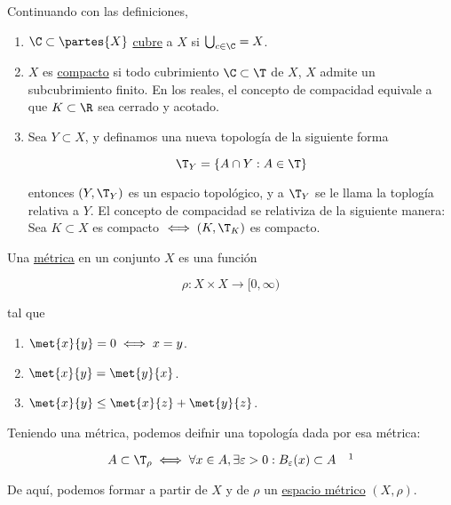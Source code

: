 \begin{defn}
    Continuando con las definiciones,
    
    \begin{enumerate}
        \item $\C \subset \partes{X}$ \ul{cubre} a $X$ si $\bigcup_{c \in \C} = X$.
        \item $X$ es \ul{compacto} si todo cubrimiento $\C \subset \T$ de $X$, $X$ admite un subcubrimiento finito. En los reales, el concepto de compacidad equivale a que $K \subset \R$ sea cerrado y acotado.
        \item Sea $Y \subset X$, y definamos una nueva topología de la siguiente forma
        
        \[
        \T_Y = \{A \cap Y : A \in \T\}
        \]
        
        \noindent entonces $(Y, \T_Y)$ es un espacio topológico, y a $\T_Y$ se le llama la toplogía relativa a $Y$. El concepto de compacidad se relativiza de la siguiente manera: Sea $K \subset X$ es compacto $\iff (K, \T_K)$ es compacto.
    \end{enumerate}
\end{defn}

\begin{defn}
    Una \ul{métrica} en un conjunto $X$ es una función
    
    \[
    \rho: X \times X \rightarrow [0, \infty)
    \]
    
    \noindent tal que
    
    \begin{enumerate}
        \item $\met{x}{y} = 0 \iff x = y$.
        \item $\met{x}{y} = \met{y}{x}$.
        \item $\met{x}{y} \leq \met{x}{z} + \met{y}{z}$.
    \end{enumerate}
    
    Teniendo una métrica, podemos deifnir una topología dada por esa métrica:
    
    \[
    A \subset \T_{\rho} \iff \forall x \in A, \exists \varepsilon > 0 : B_{\varepsilon}(x) \subset A \quad \footnotemark
    \]
    
    De aquí, podemos formar a partir de $X$ y de $\rho$ un \ul{espacio métrico} $(X, \rho)$.
\end{defn}

